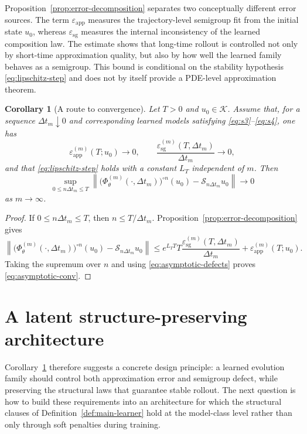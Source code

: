 \documentclass[11pt]{article}
\newtheorem{corollary}{Corollary}
\newcommand{\cS}{\mathcal{S}}
\newcommand{\cK}{\mathcal{K}}
\newcommand{\PhiT}{\Phi_{\theta}}
\newcommand{\norm}[1]{\left\lVert #1 \right\rVert}
\begin{document}
Proposition~\ref{prop:error-decomposition} separates two conceptually different error sources. The term \(\varepsilon_{\mathrm{app}}\) measures the trajectory-level semigroup fit from the initial state \(u_0\), whereas \(\varepsilon_{\mathrm{sg}}\) measures the internal inconsistency of the learned composition law. The estimate shows that long-time rollout is controlled not only by short-time approximation quality, but also by how well the learned family behaves as a semigroup. This bound is conditional on the stability hypothesis \eqref{eq:lipschitz-step} and does not by itself provide a PDE-level approximation theorem.

\begin{corollary}[A route to convergence]\label{cor:global-convergence}
Let \(T>0\) and \(u_0\in \cK\). Assume that, for a sequence \(\Delta t_m\downarrow 0\) and corresponding learned models satisfying \eqref{eq:s3}--\eqref{eq:s4}, one has
\begin{equation}\label{eq:asymptotic-defects}
\varepsilon_{\mathrm{app}}^{(m)}(T;u_0)\to 0, \qquad \frac{\varepsilon_{\mathrm{sg}}^{(m)}(T,\Delta t_m)}{\Delta t_m}\to 0,
\end{equation}
and that \eqref{eq:lipschitz-step} holds with a constant \(L_T\) independent of \(m\). Then
\begin{equation}\label{eq:asymptotic-conv}
\sup_{0\le n\Delta t_m\le T}\norm{\bigl(\PhiT^{(m)}(\cdot,\Delta t_m)\bigr)^{\circ n}(u_0)-\cS_{n\Delta t_m}u_0}\to 0
\end{equation}
as \(m\to \infty\).
\end{corollary}

\begin{proof}
If \(0\le n\Delta t_m\le T\), then \(n\le T/\Delta t_m\). Proposition~\ref{prop:error-decomposition} gives
\begin{equation*}
\norm{\bigl(\PhiT^{(m)}(\cdot,\Delta t_m)\bigr)^{\circ n}(u_0)-\cS_{n\Delta t_m}u_0}
\le e^{L_TT}T\frac{\varepsilon_{\mathrm{sg}}^{(m)}(T,\Delta t_m)}{\Delta t_m}+\varepsilon_{\mathrm{app}}^{(m)}(T;u_0).
\end{equation*}
Taking the supremum over \(n\) and using \eqref{eq:asymptotic-defects} proves \eqref{eq:asymptotic-conv}.
\end{proof}

\section{A latent structure-preserving architecture}\label{sec:latent-architecture}
Corollary~\ref{cor:global-convergence} therefore suggests a concrete design principle: a learned evolution family should control both approximation error and semigroup defect, while preserving the structural laws that guarantee stable rollout. The next question is how to build these requirements into an architecture for which the structural clauses of Definition~\ref{def:main-learner} hold at the model-class level rather than only through soft penalties during training.
\end{document}
